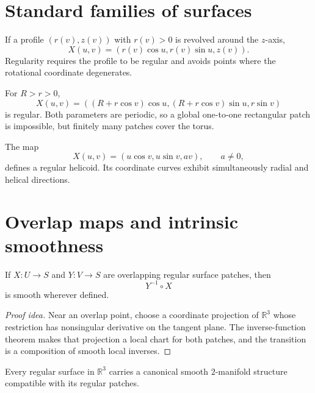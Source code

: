 \section{Standard families of surfaces}
\begin{example}\label{ex:vii14-revolution}
If a profile \((r(v),z(v))\) with \(r(v)>0\) is revolved around the \(z\)-axis,
\[
X(u,v)=(r(v)\cos u,r(v)\sin u,z(v)).
\]
Regularity requires the profile to be regular and avoids points where the rotational coordinate degenerates.
\end{example}

\begin{example}[Torus]\label{ex:vii14-torus}
For \(R>r>0\),
\[
X(u,v)=((R+r\cos v)\cos u,(R+r\cos v)\sin u,r\sin v)
\]
is regular.  Both parameters are periodic, so a global one-to-one rectangular patch is impossible, but finitely many patches cover the torus.
\end{example}

\begin{example}[Helicoid]\label{ex:vii14-helicoid}
The map
\[
X(u,v)=(u\cos v,u\sin v,av),\qquad a\neq0,
\]
defines a regular helicoid.  Its coordinate curves exhibit simultaneously radial and helical directions.
\end{example}

\section{Overlap maps and intrinsic smoothness}
\begin{theorem}\label{thm:vii14-overlaps}
If \(X:U\to S\) and \(Y:V\to S\) are overlapping regular surface patches, then
\[
Y^{-1}\circ X
\]
is smooth wherever defined.
\end{theorem}
\begin{proof}[Proof idea]
Near an overlap point, choose a coordinate projection of \(\mathbb R^3\) whose restriction has nonsingular derivative on the tangent plane.  The inverse-function theorem makes that projection a local chart for both patches, and the transition is a composition of smooth local inverses.
\end{proof}

\begin{corollary}\label{cor:vii14-surface-manifold}
Every regular surface in \(\mathbb R^3\) carries a canonical smooth \(2\)-manifold structure compatible with its regular patches.
\end{corollary}

